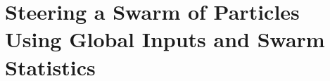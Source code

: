 \chapter[Steering a Swarm of Particles Using Global Inputs \\ and Swarm Statistics]{Steering a Swarm of Particles\\ Using Global Inputs and Swarm Statistics}\label{chap-manipulation}




%












   
%
   
%
%
%


